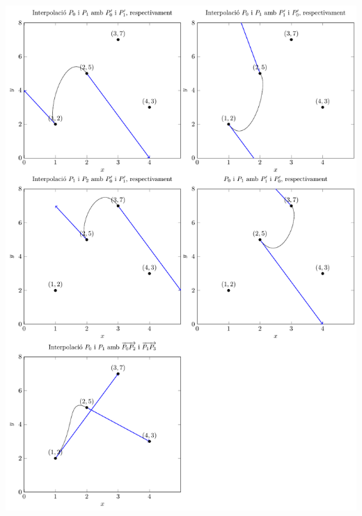\begin{llista}
\begin{minipage}[t]{\linewidth}
  \vspace{-2ex}
  \includegraphics[width=\textwidth]{../figures/interpolaciohermite.pdf}
  \label{fig:interpolaciohermite}
\end{minipage}


\end{llista}
